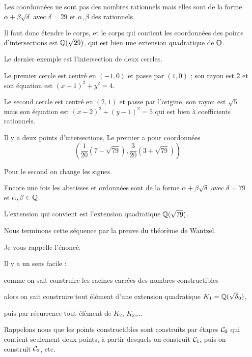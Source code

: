 \change
Les coordonnées ne sont pas des nombres rationnels
mais elles sont de la forme $\alpha+\beta\sqrt{\delta}$ avec $\delta = 29$
et $\alpha,\beta$ des rationnels.

\change
Il faut donc étendre le corps, et le corps qui contient les coordonnées
des points d'intersections est $\mathbb{Q}(\sqrt{29})$,
qui est bien une extension quadratique de $\mathbb{Q}$.

\diapo

Le dernier exemple est l'intersection de deux cercles.

\change
Le premier cercle est centré en  $(-1,0)$ et passe par $(1,0)$ ; son rayon est $2$
et son équation est $(x+1)^2+y^2=4$.

\change 
Le second cercle est centré en $(2,1)$ et passe par l'origine, son rayon est $\sqrt{5}$ mais son
équation est $(x-2)^2+(y-1)^2=5$ qui est bien à coefficients rationnels.

\change

Il y a deux points d'intersections,
Le premier a pour coordonnées 
  $$\left(\frac{1}{20}\left( 7 - \sqrt{79}\right),\frac{3}{20}\left( 3 + \sqrt{79}\right)\right)$$
  
\change
Pour le second on change les signes.

\change
Encore une fois les abscisses et ordonnées sont de la forme $\alpha+\beta\sqrt\delta$ avec 
$\delta = 79$ et $\alpha,\beta \in \mathbb{Q}$.

\change
L'extension qui convient est l'extension quadratique $\mathbb{Q}(\sqrt{79})$.


\diapo

Nous terminons cette séquence par la preuve du théorème de Wantzel.

Je vous rappelle l'énoncé. 

\change

Il y a un sens facile : 

\change
comme on sait construire les racines carrées des nombres constructibles

\change
alors on sait construire tout élément d'une extension quadratique 
$K_1 = \mathbb{Q}(\sqrt \delta_0)$, 

\change
puis par récurrence tout élément de $K_2$, $K_3$,...


\diapo
\change
Rappelons nous que les points constructibles sont construits
par étapes $\mathcal{C}_0$ qui contient seulement deux points,
à partir desquels on construit $\mathcal{C}_1$, puis on construit $\mathcal{C}_2$, etc.

